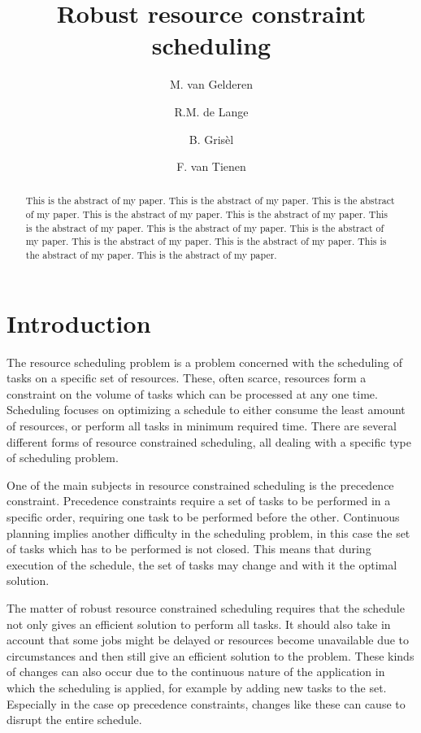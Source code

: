 \documentclass{article}
\title{Robust resource constraint scheduling}
\author{M. van Gelderen  \and
    R.M. de Lange \and
    B. Gris\`el \and
    F. van Tienen}
\begin{document}
\maketitle
\thispagestyle{empty}

\begin{abstract}
This is the abstract of my paper.
This is the abstract of my paper.
This is the abstract of my paper.
This is the abstract of my paper.
This is the abstract of my paper.
This is the abstract of my paper.
This is the abstract of my paper.
This is the abstract of my paper.
This is the abstract of my paper.
This is the abstract of my paper.
This is the abstract of my paper.
This is the abstract of my paper.
\end{abstract}


\section{Introduction}


The resource scheduling problem is a problem concerned with the scheduling of tasks on a specific set of resources. These, often scarce, resources form a constraint on the volume of tasks which can be processed at any one time. Scheduling focuses on optimizing a schedule to either consume the least amount of resources, or perform all tasks in minimum required time. There are several different forms of resource constrained scheduling, all dealing with a specific type of scheduling problem. 

One of the main subjects in resource constrained scheduling is the precedence constraint. Precedence constraints require a set of tasks to be performed in a specific order, requiring one task to be performed before the other. Continuous planning implies another difficulty in the scheduling problem, in this case the set of tasks which has to be performed is not closed. This means that during execution of the schedule, the set of tasks may change and with it the optimal solution.

The matter of robust resource constrained scheduling requires that the schedule not only gives an efficient solution to perform all tasks. It  should also take in account that some jobs might be delayed or resources become unavailable due to circumstances and then still give an efficient solution to the problem. These kinds of changes can also occur due to the continuous nature of the application in which the scheduling is applied, for example by adding new tasks to the set.  Especially in the case op precedence constraints, changes like these can cause to disrupt the entire schedule.
\end{document}

